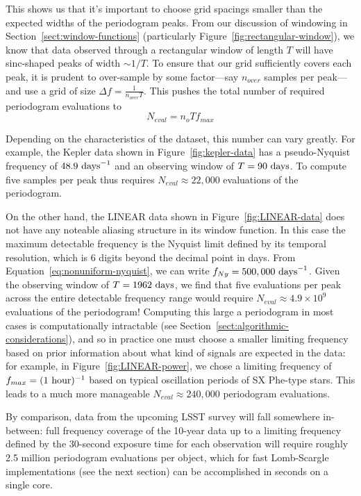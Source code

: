 \documentclass[preprint]{aastex}
\newcommand{\fig}[1]{Figure~\ref{fig:#1}}
\newcommand{\Eq}[1]{Equation~\ref{eq:#1}}
\newcommand{\eq}[1]{\Eq{#1}}
\newcommand{\eqlabel}[1]{\label{eq:#1}}
\newcommand{\Sect}[1]{Section~\ref{sect:#1}}
\newcommand{\sect}[1]{\Sect{#1}}
\begin{document}
This shows us that it's important to choose grid spacings smaller than the
expected widths of the periodogram peaks.
From our discussion of windowing in \sect{window-functions}
(particularly \fig{rectangular-window}), we know that data observed through a
rectangular window of length $T$ will have sinc-shaped peaks of width
${\sim}1/T$.
To ensure that our grid sufficiently covers each peak, it is prudent to
over-sample by some factor---say $n_{over}$ samples per peak---and
use a grid of size $\Delta f = \frac{1}{n_{over} T}$.
This pushes the total number of required periodogram evaluations to
\begin{equation}
  \eqlabel{n-eval}
  N_{eval} = n_o T f_{max}
\end{equation}

Depending on the characteristics of the dataset, this number can vary greatly.
For example, the Kepler data shown in \fig{kepler-data} has a pseudo-Nyquist
frequency of $48.9\ {\rm days}^{-1}$ and
an observing window of $T = 90\ {\rm days}$.
To compute five samples per peak thus requires $N_{eval} \approx 22,000$
evaluations of the periodogram.

On the other hand, the LINEAR data shown in \fig{LINEAR-data} does not have
any noteable aliasing structure in its window function.
In this case the maximum detectable frequency is the Nyquist limit defined
by its temporal resolution, which is 6 digits beyond the decimal point in days.
From \eq{nonuniform-nyquist}, we can write $f_{Ny} = 500,000\ {\rm days}^{-1}$.
Given the observing window of $T = 1962\ {\rm days}$, we find that five
evaluations per peak across the entire detectable frequency range
would require $N_{eval} \approx 4.9 \times 10^9$ evaluations of the periodogram!
Computing this large a periodogram in most cases is computationally intractable
(see \sect{algorithmic-considerations}), and so in practice one must choose
a smaller limiting frequency based on prior information about what kind of
signals are expected in the data: for example, in \fig{LINEAR-power}, we chose
a limiting frequency of $f_{max} = (1\ {\rm hour})^{-1}$ based on typical
oscillation periods of SX Phe-type stars. This leads to a much more manageable
$N_{eval} \approx 240,000$ periodogram evaluations.

By comparison, data from the upcoming LSST survey \citep{Ivezic08LSST}
will fall somewhere in-between: full frequency coverage of
the 10-year data up to a limiting frequency defined by the 30-second
exposure time for each observation will require roughly 2.5 million
periodogram evaluations per object, which for fast Lomb-Scargle implementations
(see the next section) can be accomplished in seconds on a single core.
\end{document}
